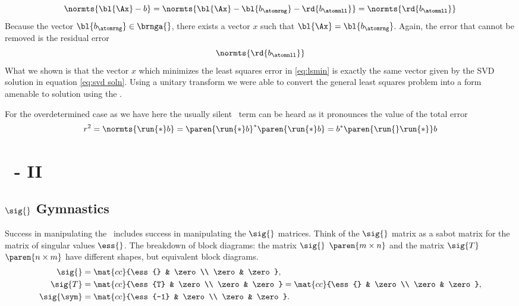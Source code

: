   \begin{equation*}   %
    \normts{ \bl{\Ax} - b } = \normts{ \bl{\Ax} - \bl{b_{\atomrng}} - \rd{b_{\atomnll}} } = \normts{ \rd{b_{\atomnll}} }
  \end{equation*}
Because the vector $\bl{b_{\atomrng}} \in \brnga{}$, there exists a vector $x$ such that $\bl{\Ax} = \bl{b_{\atomrng}}$. Again, the error that cannot be removed is the residual error
  \begin{equation*}   %
    \normts{ \rd{b_{\atomnll}} }
  \end{equation*}
What we shown is that the vector $x$ which minimizes the least squares error in \eqref{eq:lsmin} is exactly the same vector given by the SVD solution in equation \eqref{eq:svd soln}. Using a unitary transform we were able to convert the general least squares problem into a form amenable to solution using the \asvd.

For the overdetermined case as we have here the usually silent \ns \ term can be heard as it pronounces the value of the total error
\begin{equation}
  r^{2} = \normts{ \run{*} b  } = \paren{ \run{*} b  }^{*} \paren{ \run{*} b  } = b^{*} \paren{ \run{}\run{*} } b 
  \label{eq:r2:a}
\end{equation}

\section{\bsvd\ - II}  %

\subsection{$\sig{}$ Gymnastics}  %
Success in manipulating the \asvd \ includes success in manipulating the $\sig{}$ matrices. Think of the $\sig{}$ matrix as a sabot matrix for the matrix of singular values $\ess{}$. 
The breakdown of block diagrams: the matrix $\sig{}$ $\paren{m \times n}$ and the matrix $\sig{T}$ $\paren{n \times m}$ have different shapes, but equivalent block diagrams.
  \begin{equation*}   %
    \begin{split}
      \sig{}  &= \mat{cc}{\ess{} & \zero \\ \zero & \zero }, \\
      \sig{T} &= \mat{cc}{\ess{T} & \zero \\ \zero & \zero } = \mat{cc}{\ess{} & \zero \\ \zero & \zero }, \\
      \sig{\sym} &= \mat{cc}{\ess{-1} & \zero \\ \zero & \zero }.
    \end{split}
  \end{equation*}

